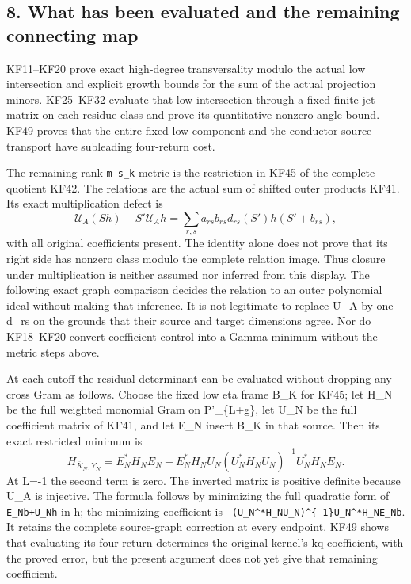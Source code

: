 \subsection{8. What has been evaluated and the remaining connecting map}\label{what-has-been-evaluated-and-the-remaining-connecting-map}

KF11--KF20 prove exact high-degree transversality modulo the actual low intersection and explicit growth bounds for the sum of the actual projection minors. KF25--KF32 evaluate that low intersection through a fixed finite jet matrix on each residue class and prove its quantitative nonzero-angle bound. KF49 proves that the entire fixed low component and the conductor source transport have subleading four-return cost.

The remaining rank \texttt{m-s\_k} metric is the restriction in KF45 of the complete quotient KF42. The relations are the actual sum of shifted outer products KF41. Its exact multiplication defect is \[
\mathcal U_A(Sh)-S'\mathcal U_Ah
=\sum_{r,s}a_{rs}b_{rs}d_{rs}(S')h(S'+b_{rs}),
\tag{KF50}
\] with all original coefficients present. The identity alone does not prove that its right side has nonzero class modulo the complete relation image. Thus closure under multiplication is neither assumed nor inferred from this display. The following exact graph comparison decides the relation to an outer polynomial ideal without making that inference. It is not legitimate to replace U\_A by one d\_rs on the grounds that their source and target dimensions agree. Nor do KF18--KF20 convert coefficient control into a Gamma minimum without the metric steps above.

At each cutoff the residual determinant can be evaluated without dropping any cross Gram as follows. Choose the fixed low eta frame B\_K for KF45; let H\_N be the full weighted monomial Gram on P'\_\{L+g\}, let U\_N be the full coefficient matrix of KF41, and let E\_N insert B\_K in that source. Then its exact restricted minimum is \[
\boxed{H_{\overline K_N,Y_N}=
E_N^*H_NE_N-E_N^*H_NU_N(U_N^*H_NU_N)^{-1}U_N^*H_NE_N.}
\tag{KF51}
\] At L=-1 the second term is zero. The inverted matrix is positive definite because U\_A is injective. The formula follows by minimizing the full quadratic form of \texttt{E\_Nb+U\_Nh} in h; the minimizing coefficient is \nolinkurl{-(U_N^*H_NU_N)^{-1}U_N^*H_NE_Nb}. It retains the complete source-graph correction at every endpoint. KF49 shows that evaluating its four-return determines the original kernel's kq coefficient, with the proved error, but the present argument does not yet give that remaining coefficient.


